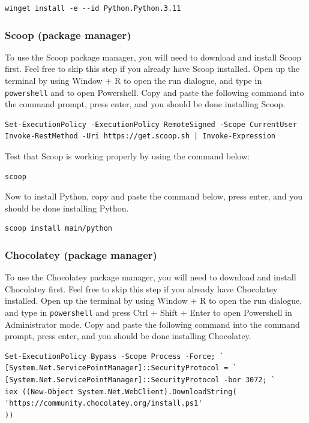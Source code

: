 \documentclass[11pt]{article}
\begin{document}
\begin{verbatim}
winget install -e --id Python.Python.3.11
\end{verbatim}

 \newpage

\subsubsection{Scoop (package manager)}
\label{sec:orgba3caf2}
To use the Scoop package manager, you will need to download and install Scoop first. Feel free to skip this step if you already have Scoop installed. Open up the terminal by using Window + R to open the run dialogue, and type in \texttt{powershell} and to open Powershell. Copy and paste the following command into the command prompt, press enter, and you should be done installing Scoop.

\begin{verbatim}
Set-ExecutionPolicy -ExecutionPolicy RemoteSigned -Scope CurrentUser
Invoke-RestMethod -Uri https://get.scoop.sh | Invoke-Expression
\end{verbatim}

Test that Scoop is working properly by using the command below:
\begin{verbatim}
scoop
\end{verbatim}

Now to install Python, copy and paste the command below, press enter, and you should be done installing Python.
\begin{verbatim}
scoop install main/python
\end{verbatim}

\subsubsection{Chocolatey (package manager)}
\label{sec:org988aaa7}
To use the Chocolatey package manager, you will need to download and install Chocolatey first. Feel free to skip this step if you already have Chocolatey installed. Open up the terminal by using Window + R to open the run dialogue, and type in \texttt{powershell} and press Ctrl + Shift + Enter to open Powershell in Administrator mode. Copy and paste the following command into the command prompt, press enter, and you should be done installing Chocolatey.

\begin{verbatim}
Set-ExecutionPolicy Bypass -Scope Process -Force; `
[System.Net.ServicePointManager]::SecurityProtocol = `
[System.Net.ServicePointManager]::SecurityProtocol -bor 3072; `
iex ((New-Object System.Net.WebClient).DownloadString(
'https://community.chocolatey.org/install.ps1'
))
\end{verbatim}
\end{document}
